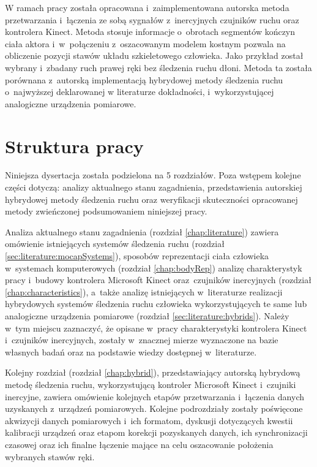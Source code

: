 W ramach pracy została opracowana i~zaimplementowana autorska metoda przetwarzania i~łączenia ze sobą sygnałów z~inercyjnych czujników ruchu oraz kontrolera Kinect. Metoda stosuje informacje o~obrotach segmentów kończyn ciała aktora i~w~połączeniu z~oszacowanym modelem kostnym pozwala na obliczenie pozycji stawów układu szkieletowego człowieka. 
Jako przykład został wybrany i~zbadany ruch prawej ręki bez śledzenia ruchu dłoni. Metoda ta została porównana z~autorską implementacją hybrydowej metody śledzenia ruchu o~najwyższej deklarowanej w literaturze dokładności, i~wykorzystującej analogiczne urządzenia pomiarowe.\\

\section{Struktura pracy}
Niniejsza dysertacja została podzielona na 5 rozdziałów. Poza wstępem kolejne części dotyczą: analizy aktualnego stanu zagadnienia, przedstawienia autorskiej hybrydowej metody śledzenia ruchu oraz weryfikacji skuteczności opracowanej metody zwieńczonej podsumowaniem niniejszej pracy. 

Analiza aktualnego stanu zagadnienia (rozdział \ref{chap:literature}) zawiera omówienie istniejących systemów śledzenia ruchu (rozdział \ref{sec:literature:mocapSystems}), sposobów reprezentacji ciała człowieka w~systemach komputerowych (rozdział \ref{chap:bodyRep}) analizę charakterystyk pracy i~budowy kontrolera Microsoft Kinect oraz~czujników inercyjnych (rozdział \ref{chap:characteristics}), a~także analizę istniejących w~literaturze realizacji hybrydowych systemów śledzenia ruchu człowieka wykorzystujących te same lub analogiczne urządzenia pomiarowe (rozdział \ref{sec:literature:hybrids}). Należy w~tym miejscu zaznaczyć, że opisane w~pracy charakterystyki kontrolera Kinect i~czujników inercyjnych, zostały w~znacznej mierze wyznaczone na bazie własnych badań oraz na podstawie wiedzy dostępnej w~literaturze.

Kolejny rozdział (rozdział \ref{chap:hybrid}), przedstawiający autorską hybrydową metodę śledzenia ruchu, wykorzystującą kontroler Microsoft Kinect i~czujniki inercyjne, zawiera omówienie kolejnych etapów przetwarzania i~łączenia danych uzyskanych z~urządzeń pomiarowych. Kolejne podrozdziały zostały poświęcone akwizycji danych pomiarowych i~ich formatom, dyskusji dotyczących kwestii kalibracji urządzeń oraz etapom korekcji pozyskanych danych, ich synchronizacji czasowej oraz ich finalne łączenie mające na celu oszacowanie położenia wybranych stawów ręki. 

